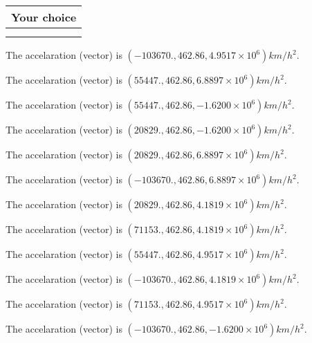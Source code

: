 \documentclass[12pt]{article}
\begin{document}
  
  
\noindent\hspace{3.0in} \begin{tabular}{|l|}
\hline
Your choice \\
\hline
 \\ 
 \\ 
\hline
\end{tabular}
  
  
 
 
The accelaration (vector) is
$(
-103670.,
462.86 ,
4.9517 \times 10^{6}
)km/h^2.
$
 
 
The accelaration (vector) is
$(
55447.,
462.86 ,
6.8897 \times 10^{6}
)km/h^2.
$
 
 
The accelaration (vector) is
$(
55447.,
462.86 ,
-1.6200 \times 10^{6}
)km/h^2.
$
 
 
The accelaration (vector) is
$(
20829.,
462.86 ,
-1.6200 \times 10^{6}
)km/h^2.
$
 
 
The accelaration (vector) is
$(
20829.,
462.86 ,
6.8897 \times 10^{6}
)km/h^2.
$
 
 
The accelaration (vector) is
$(
-103670.,
462.86 ,
6.8897 \times 10^{6}
)km/h^2.
$
 
 
The accelaration (vector) is
$(
20829.,
462.86 ,
4.1819 \times 10^{6}
)km/h^2.
$
 
 
The accelaration (vector) is
$(
71153.,
462.86 ,
4.1819 \times 10^{6}
)km/h^2.
$
 
 
The accelaration (vector) is
$(
55447.,
462.86 ,
4.9517 \times 10^{6}
)km/h^2.
$
 
 
The accelaration (vector) is
$(
-103670.,
462.86 ,
4.1819 \times 10^{6}
)km/h^2.
$
 
 
The accelaration (vector) is
$(
71153.,
462.86 ,
4.9517 \times 10^{6}
)km/h^2.
$
 
 
The accelaration (vector) is
$(
-103670.,
462.86 ,
-1.6200 \times 10^{6}
)km/h^2.
$
 
 
 
 

 
 
\vspace{0.3in}
   
\end{document}
